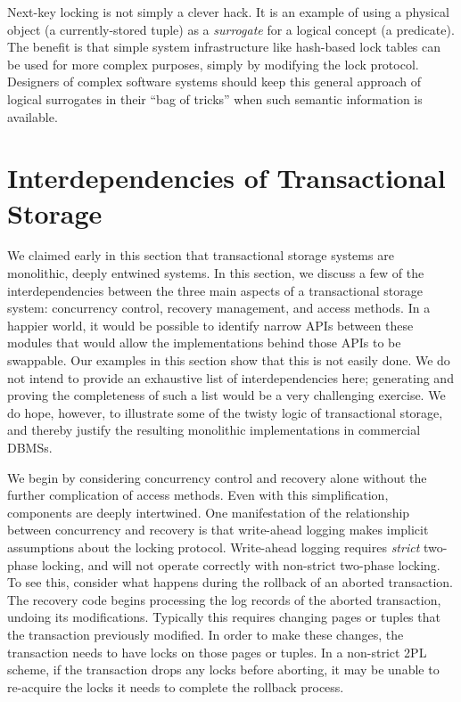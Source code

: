 \documentclass[b5paper,11pt,twoside,openright]{book}
\begin{document}
Next-key locking is not simply a clever hack. It is an example of using
a physical object (a currently-stored tuple) as a \emph{surrogate} for a
logical concept (a predicate). The benefit is that simple system
infrastructure like hash-based lock tables can be used for more complex
purposes, simply by modifying the lock protocol. Designers of complex
software systems should keep this general approach of logical surrogates
in their ``bag of tricks'' when such semantic information is available.

\hypertarget{interdependencies-of-transactional-storage}{%
\section{Interdependencies of Transactional
Storage}\label{interdependencies-of-transactional-storage}}

We claimed early in this section that transactional storage systems are
monolithic, deeply entwined systems. In this section, we discuss a few
of the interdependencies between the three main aspects of a
transactional storage system: concurrency control, recovery management,
and access methods. In a happier world, it would be possible to identify
narrow APIs between these modules that would allow the implementations
behind those APIs to be swappable. Our examples in this section show
that this is not easily done. We do not intend to provide an exhaustive
list of interdependencies here; generating and proving the completeness
of such a list would be a very challenging exercise. We do hope,
however, to illustrate some of the twisty logic of transactional
storage, and thereby justify the resulting monolithic implementations in
commercial DBMSs.

We begin by considering concurrency control and recovery alone without
the further complication of access methods. Even with this
simplification, components are deeply intertwined. One manifestation of
the relationship between concurrency and recovery is that write-ahead
logging makes implicit assumptions about the locking protocol.
Write-ahead logging requires \emph{strict} two-phase locking, and will
not operate correctly with non-strict two-phase locking. To see this,
consider what happens during the rollback of an aborted transaction.
The recovery code begins processing the log records of the aborted
transaction, undoing its modifications. Typically this requires changing
pages or tuples that the transaction previously modified. In order to
make these changes, the transaction needs to have locks on those pages
or tuples. In a non-strict 2PL scheme, if the transaction drops any
locks before aborting, it may be unable to re-acquire the locks it needs
to complete the rollback process.
\end{document}
